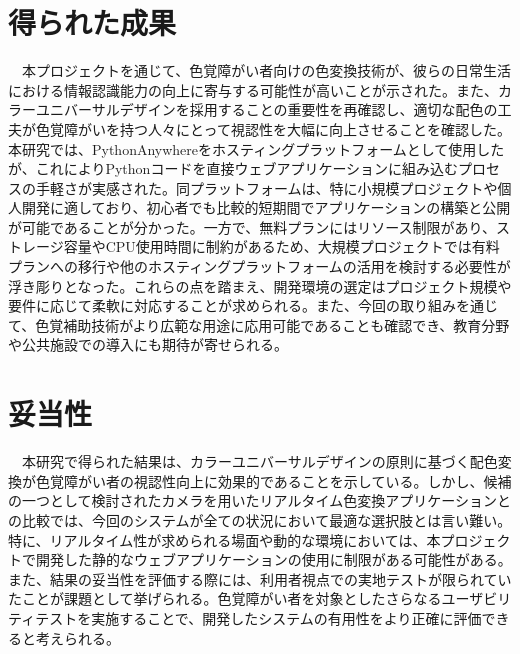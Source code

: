 \section{得られた成果}
　本プロジェクトを通じて、色覚障がい者向けの色変換技術が、彼らの日常生活における情報認識能力の向上に寄与する可能性が高いことが示された。また、カラーユニバーサルデザインを採用することの重要性を再確認し、適切な配色の工夫が色覚障がいを持つ人々にとって視認性を大幅に向上させることを確認した。本研究では、PythonAnywhereをホスティングプラットフォームとして使用したが、これによりPythonコードを直接ウェブアプリケーションに組み込むプロセスの手軽さが実感された。同プラットフォームは、特に小規模プロジェクトや個人開発に適しており、初心者でも比較的短期間でアプリケーションの構築と公開が可能であることが分かった。一方で、無料プランにはリソース制限があり、ストレージ容量やCPU使用時間に制約があるため、大規模プロジェクトでは有料プランへの移行や他のホスティングプラットフォームの活用を検討する必要性が浮き彫りとなった。これらの点を踏まえ、開発環境の選定はプロジェクト規模や要件に応じて柔軟に対応することが求められる。また、今回の取り組みを通じて、色覚補助技術がより広範な用途に応用可能であることも確認でき、教育分野や公共施設での導入にも期待が寄せられる。

\section{妥当性}
　本研究で得られた結果は、カラーユニバーサルデザインの原則に基づく配色変換が色覚障がい者の視認性向上に効果的であることを示している。しかし、候補の一つとして検討されたカメラを用いたリアルタイム色変換アプリケーションとの比較では、今回のシステムが全ての状況において最適な選択肢とは言い難い。特に、リアルタイム性が求められる場面や動的な環境においては、本プロジェクトで開発した静的なウェブアプリケーションの使用に制限がある可能性がある。また、結果の妥当性を評価する際には、利用者視点での実地テストが限られていたことが課題として挙げられる。色覚障がい者を対象としたさらなるユーザビリティテストを実施することで、開発したシステムの有用性をより正確に評価できると考えられる。

